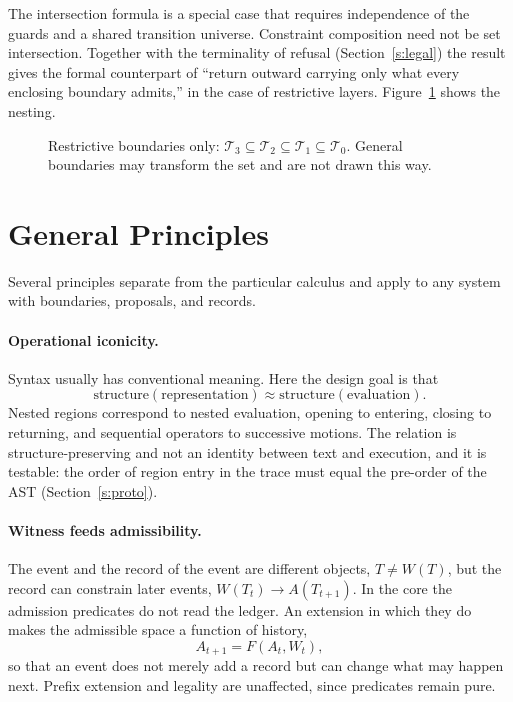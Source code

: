 \documentclass[11pt]{article}
\begin{document}
The intersection formula is a special case that requires independence of the guards and a shared transition universe. Constraint composition need not be set intersection. Together with the terminality of refusal (Section~\ref{s:legal}) the result gives the formal counterpart of ``return outward carrying only what every enclosing boundary admits,'' in the case of restrictive layers. Figure~\ref{f:nest} shows the nesting.

\begin{figure}[h]
\centering
{}
\caption{Restrictive boundaries only: $\mathcal T_3\subseteq\mathcal T_2\subseteq\mathcal T_1\subseteq\mathcal T_0$. General boundaries may transform the set and are not drawn this way.}
\label{f:nest}
\end{figure}

\section{General Principles}\label{s:prin}

Several principles separate from the particular calculus and apply to any system with boundaries, proposals, and records.

\paragraph{Operational iconicity.} Syntax usually has conventional meaning. Here the design goal is that
\[
\mathrm{structure}(\text{representation})\approx\mathrm{structure}(\text{evaluation}).
\]
Nested regions correspond to nested evaluation, opening to entering, closing to returning, and sequential operators to successive motions. The relation is structure-preserving and not an identity between text and execution, and it is testable: the order of region entry in the trace must equal the pre-order of the AST (Section~\ref{s:proto}).

\paragraph{Witness feeds admissibility.} The event and the record of the event are different objects, $T\neq W(T)$, but the record can constrain later events, $W(T_t)\to A(T_{t+1})$. In the core the admission predicates do not read the ledger. An extension in which they do makes the admissible space a function of history,
\[
A_{t+1}=F(A_t,W_t),
\]
so that an event does not merely add a record but can change what may happen next. Prefix extension and legality are unaffected, since predicates remain pure.
\end{document}

